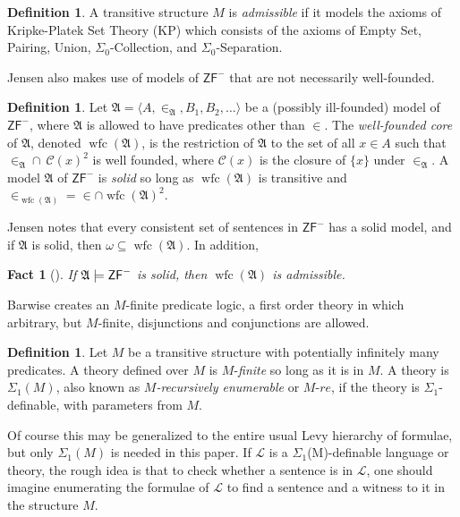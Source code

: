 \documentclass{amsart}
\newtheorem{fact}[theorem]{Fact}
\theoremstyle{definition}
\newtheorem{definition}[theorem]{Definition}
\theoremstyle{remark}
\DeclareMathOperator{\wfc}{wfc}
\begin{document}
\begin{definition} A transitive structure $M$ is \emph{admissible} if it models the axioms of \textsf{Kripke-Platek Set Theory} (\textsf{KP}) which consists of the axioms of \textsf{Empty Set}, \textsf{Pairing}, \textsf{Union}, $\Sigma_0$-\textsf{Collection}, and $\Sigma_0$-\textsf{Separation}. \end{definition}

Jensen also makes use of models of $\textsf{ZF}^-$ that are not necessarily well-founded.
\begin{definition} Let $\mathfrak A = \langle A, \in_{\mathfrak A}, B_1, B_2, \dots \rangle$ be a (possibly ill-founded) model  of $\textsf{ZF}^-$, where $\mathfrak A$ is allowed to have predicates other than $\in$. The \emph{well-founded core} of $\mathfrak A$, denoted $\wfc(\mathfrak A)$, is the restriction of $\mathfrak A$ to the set of all $x \in A$ such that $\in_{\mathfrak A} \cap \ \mathcal C(x)^2$ is well founded, where $\mathcal C(x)$ is the closure of $\{x\}$ under $\in_{\mathfrak A}$. A model $\mathfrak A$ of $\textsf{ZF}^-$ is \emph{solid} so long as $\wfc(\mathfrak A)$ is transitive and $\in_{\wfc(\mathfrak A)}=\in \cap \wfc(\mathfrak A)^2$. \end{definition}

Jensen \cite[Section 1.2]{Jensen:2014} notes that every consistent set of sentences in $\textsf{ZF}^-$ has a solid model, and if $\mathfrak A$ is solid, then $\omega \subseteq \wfc(\mathfrak A)$. In addition,

\begin{fact}[{\cite[Ch. 1, Lemma 21]{Jensen:2014}}] If $\mathfrak A \models \textsf{\textup{ZF}}^-$ is solid, then $\wfc(\mathfrak A)$ is admissible. \end{fact}

Barwise creates an $M$-finite predicate logic, a first order theory in which arbitrary, but $M$-finite, disjunctions and conjunctions are allowed.
\begin{definition} Let $M$ be a transitive structure with potentially infinitely many predicates. A theory defined over $M$ is $M$-\emph{finite} so long as it is in $M$. A theory is $\Sigma_1(M)$, also known as \emph{$M$-recursively enumerable} or $M$-$re$, if the theory is $\Sigma_1$-definable, with parameters from $M$. \end{definition}
Of course this may be generalized to the entire usual Levy hierarchy of formulae, but only $\Sigma_1(M)$ is needed in this paper. If $\mathcal L$ is a $\Sigma_1$(M)-definable language or theory, the rough idea is that to check whether a sentence is in $\mathcal L$, one should imagine enumerating the formulae of $\mathcal L$ to find a sentence and a witness to it in the structure $M$.
\end{document}
